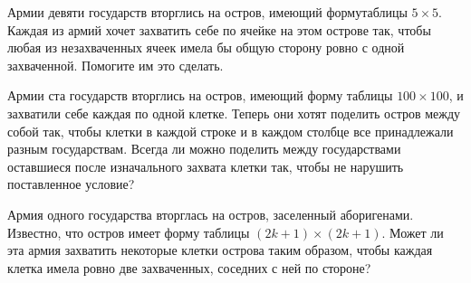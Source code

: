 ﻿
\begin{itemize}

\itA Армии девяти государств вторглись на остров, имеющий форму\linebreak таблицы $5 \times 5$. Каждая из армий хочет захватить себе по ячейке на этом острове так, чтобы любая из незахваченных ячеек имела бы общую сторону ровно с одной захваченной. Помогите им это сделать.

\itB Армии ста государств вторглись на остров, имеющий форму таблицы $100 \times 100$, и захватили себе каждая по одной клетке. Теперь они хотят поделить остров между собой так, чтобы клетки в каждой строке и в каждом столбце все принадлежали разным государствам. Всегда ли можно поделить между государствами оставшиеся после изначального захвата клетки так, чтобы не нарушить поставленное условие?

\itC Армия одного государства вторглась на остров, заселенный аборигенами. Известно, что остров имеет форму таблицы $(2k+1) \times (2k+1)$. Может ли эта армия захватить некоторые клетки острова таким образом, чтобы каждая клетка имела ровно две захваченных, соседних с ней по стороне?
\end{itemize}